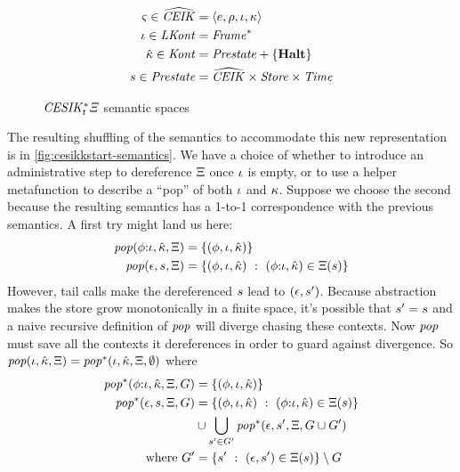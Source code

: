 \begin{figure}
  \centering
  \begin{align*}
    \varsigma \in \widehat{\mathit{CEIK}} &= \langle e,\rho,\iota,\kappa \rangle \\
    \iota \in \mathit{LKont} &= \mathit{Frame}^* \\
    \hat{\kappa} \in \mathit{Kont} &= \mathit{Prestate} + \{ \mathbf{Halt} \} \\
    s \in \mathit{Prestate} &= \widehat{\mathit{CEIK}} \times \mathit{Store} \times \mathit{Time} \\
  \end{align*}
  \caption{$\mathit{CESIK^*_t\Xi}$ semantic spaces}
  \label{fig:pushdown-spaces}
\end{figure}

The resulting shuffling of the semantics to accommodate this new representation is in \autoref{fig:cesikkstart-semantics}.
%
We have a choice of whether to introduce an administrative step to dereference $\Xi$ once $\iota$ is empty, or to use a helper metafunction to describe a ``pop'' of both $\iota$ and $\kappa$.
%
Suppose we choose the second because the resulting semantics has a 1-to-1 correspondence with the previous semantics.
%
A first try might land us here:
\begin{align*}
  \mathit{pop}(\phi{\tt :} \iota,\hat{\kappa},\Xi) &= \{ (\phi,\iota,\hat{\kappa}) \} \\
  \mathit{pop}(\epsilon,s,\Xi) &= \{ (\phi,\iota,\hat{\kappa})\ :\ (\phi{\tt :} \iota, \hat{\kappa}) \in \Xi(s)\}
\end{align*}
However, tail calls make the dereferenced $s$ lead to $(\epsilon,s')$.
%
Because abstraction makes the store grow monotonically in a finite space, it's possible that $s' = s$ and a naive recursive definition of $\mathit{pop}$ will diverge chasing these contexts.
%
Now $\mathit{pop}$ must save all the contexts it dereferences in order to guard against divergence.
%
So $\mathit{pop}(\iota,\hat{\kappa},\Xi) = \mathit{pop}^*(\iota,\hat{\kappa},\Xi,\emptyset)$ where
\begin{align*}
  \mathit{pop}^*(\phi{\tt :} \iota,\hat{\kappa},\Xi,G) &= \{ (\phi,\iota,\hat{\kappa}) \} \\
  \mathit{pop}^*(\epsilon,s,\Xi,G) &= \{ (\phi,\iota,\hat{\kappa})\ :\ (\phi{\tt :} \iota, \hat{\kappa}) \in \Xi(s)\} \\
  &\cup \bigcup\limits_{s' \in G'}\mathit{pop}^*(\epsilon,s',\Xi,G\cup G') \\
  \text{where } G' &= \{ s'\ :\ (\epsilon,s') \in \Xi(s)\} \setminus G
\end{align*}

